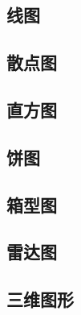 \subsection{线图}

\subsection{散点图}

\subsection{直方图}

\subsection{饼图}

\subsection{箱型图}

\subsection{雷达图}

\subsection{三维图形}

